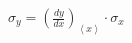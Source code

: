 \documentclass[12pt]{article}
\begin{document}
$\sigma_y=(\frac{dy}{dx})_{\left<x\right>}\cdot \sigma_x $
\end{document}
